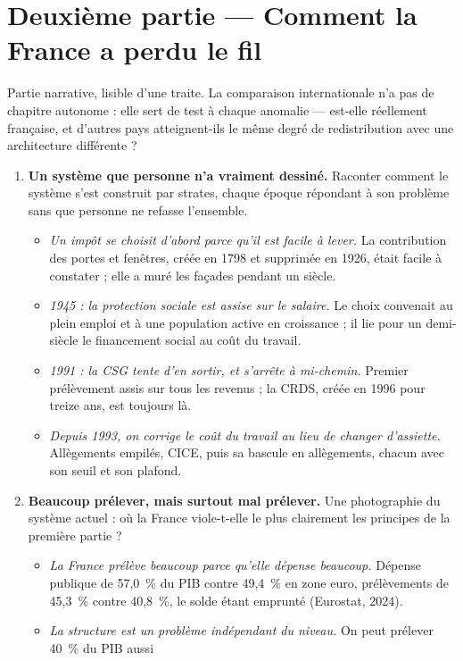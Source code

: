 \documentclass[11pt,a4paper]{article}
\newenvironment{chapitres}[1]
{\begin{enumerate}[leftmargin=1.6em,itemsep=0.15em,parsep=0pt,topsep=0.20em,start=#1]}
{\end{enumerate}}
\newenvironment{args}
{\begin{itemize}[leftmargin=1.1em,itemsep=0.1em,parsep=0pt,topsep=0.12em,label=\textbullet]}
{\end{itemize}}
\begin{document}
\section{Deuxième partie --- Comment la France a perdu le fil}

Partie narrative, lisible d'une traite. La comparaison internationale n'a pas de chapitre autonome :
elle sert de test à chaque anomalie --- est-elle réellement française, et d'autres pays
atteignent-ils le même degré de redistribution avec une architecture différente ?

\begin{chapitres}{4}
\item \textbf{Un système que personne n'a vraiment dessiné.} Raconter comment le système s'est
construit par strates, chaque époque répondant à son problème sans que personne ne refasse
l'ensemble.
\begin{args}
\item \emph{Un impôt se choisit d'abord parce qu'il est facile à lever.} La contribution des portes
et fenêtres, créée en 1798 et supprimée en 1926, était facile à constater ; elle a muré les façades
pendant un siècle.
\item \emph{1945 : la protection sociale est assise sur le salaire.} Le choix convenait au plein
emploi et à une population active en croissance ; il lie pour un demi-siècle le financement social au
coût du travail.
\item \emph{1991 : la CSG tente d'en sortir, et s'arrête à mi-chemin.} Premier prélèvement assis sur
tous les revenus ; la CRDS, créée en 1996 pour treize ans, est toujours là.
\item \emph{Depuis 1993, on corrige le coût du travail au lieu de changer d'assiette.} Allègements
empilés, CICE, puis sa bascule en allègements, chacun avec son seuil et son plafond.
\end{args}
\item \textbf{Beaucoup prélever, mais surtout mal prélever.} Une photographie du système actuel : où
la France viole-t-elle le plus clairement les principes de la première partie ?
\begin{args}
\item \emph{La France prélève beaucoup parce qu'elle dépense beaucoup.} Dépense publique de
57,0~\% du PIB contre 49,4~\% en zone euro, prélèvements de 45,3~\% contre 40,8~\%, le solde étant
emprunté (Eurostat, 2024).
\item \emph{La structure est un problème indépendant du niveau.} On peut prélever 40~\% du PIB aussi

\end{args}
\end{chapitres}
\end{document}
